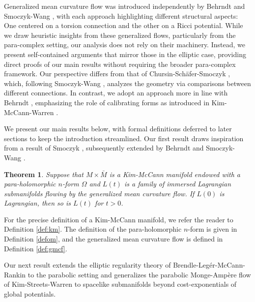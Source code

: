 \documentclass[12pt,letterpaper]{amsart}%
\newcounter{mycounter}
\numberwithin{mycounter}{section}
\newtheorem{theorem}[mycounter]{Theorem}
\theoremstyle{plain}
\numberwithin{equation}{section}
\theoremstyle{definition}
\begin{document}
Generalized mean curvature flow was introduced independently by Behrndt \cite{B} and Smoczyk-Wang \cite{SWAsianJMath}, with each approach highlighting different structural aspects: One centered on a torsion connection and the other on a Ricci potential. While we draw heuristic insights from these generalized flows, particularly from the para-complex setting, our analysis does not rely on their machinery. Instead, we present self-contained arguments that mirror those in the elliptic case, providing direct proofs of our main results without requiring the broader para-complex framework.
Our perspective differs from that of Chursin-Sch\"afer-Smoczyk \cite{CSS}, which, following Smoczyk-Wang \cite{SWAsianJMath}, analyzes the geometry via comparisons between different connections. In contrast, we adopt an approach more in line with Behrndt \cite{B}, emphasizing the role of calibrating forms as introduced in Kim-McCann-Warren \cite{KMW}. 


We present our main results below, with formal definitions deferred to later sections to keep the introduction streamlined. 
Our first result draws inspiration from a result of Smoczyk \cite{Smo99}, subsequently extended by Behrndt \cite{B} and Smoczyk-Wang \cite{SWAsianJMath}. 


\begin{theorem}
\label{thm:main1}Suppose that $M \times \bar{M}$ is a Kim-McCann manifold endowed with a para-holomorphic $n$-form $\Omega $  and $L(t)$ is a family of immersed Lagrangian submanifolds flowing by the generalized mean curvature flow.   If $L(0)$ is  Lagrangian, then so is $L(t)$ for $t>0$.   
\end{theorem}

For the precise definition of a Kim-McCann manifold, we refer the reader to Definition \ref{def:km}. The definition of the para-holomorphic $n$-form is given in Definition \ref{defom}, and the generalized mean curvature flow is defined in Definition \ref{def:gmcf}.


\smallskip
Our next result extends the elliptic regularity theory of Brendle-Leg\'er-McCann-Rankin \cite{BLMR} to the parabolic setting and generalizes the parabolic Monge-Ampère flow of Kim-Streets-Warren \cite{KSW} to spacelike submanifolds beyond cost-exponentials of global potentials.
\end{document}
